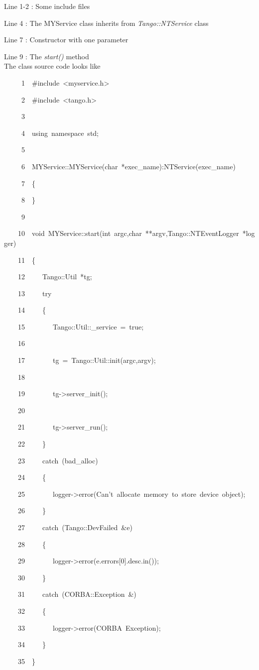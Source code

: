 Line 1-2 : Some include files

Line 4 : The MYService class inherits from \emph{Tango::NTService}
class

Line 7 : Constructor with one parameter

Line 9 : The \emph{start()} method\\


The class source code looks like


\begin{lyxcode}
~~~~~1~~\#include~<myservice.h>

~~~~~2~~\#include~<tango.h>

~~~~~3~~

~~~~~4~~using~namespace~std;

~~~~~5~~

~~~~~6~~MYService::MYService(char~{*}exec\_name):NTService(exec\_name)

~~~~~7~~\{

~~~~~8~~\}

~~~~~9~~

~~~~10~~void~MYService::start(int~argc,char~{*}{*}argv,Tango::NTEventLogger~{*}logger)

~~~~11~~\{

~~~~12~~~~~Tango::Util~{*}tg;

~~~~13~~~~~try

~~~~14~~~~~\{

~~~~15~~~~~~~~Tango::Util::\_service~=~true;

~~~~16~~

~~~~17~~~~~~~~tg~=~Tango::Util::init(argc,argv);

~~~~18~~

~~~~19~~~~~~~~tg->server\_init();

~~~~20~~

~~~~21~~~~~~~~tg->server\_run();

~~~~22~~~~~\}

~~~~23~~~~~catch~(bad\_alloc)

~~~~24~~~~~\{

~~~~25~~~~~~~~logger->error(\textquotedbl{}Can't~allocate~memory~to~store~device~object\textquotedbl{});

~~~~26~~~~~\}

~~~~27~~~~~catch~(Tango::DevFailed~\&e)

~~~~28~~~~~\{

~~~~29~~~~~~~~logger->error(e.errors{[}0{]}.desc.in());

~~~~30~~~~~\}

~~~~31~~~~~catch~(CORBA::Exception~\&)

~~~~32~~~~~\{

~~~~33~~~~~~~~logger->error(\textquotedbl{}CORBA~Exception\textquotedbl{});

~~~~34~~~~~\}

~~~~35~~\}
\end{lyxcode}


